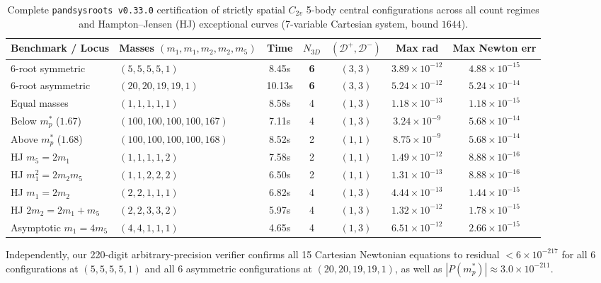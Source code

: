 \documentclass[11pt,a4paper]{amsart}
\theoremstyle{definition}
\theoremstyle{remark}
\begin{document}
\begin{table}[ht]
\centering
\caption{Complete \texttt{pandsysroots v0.33.0} certification of strictly spatial $C_{2v}$
5-body central configurations across all count regimes and Hampton--Jensen (HJ)
exceptional curves (7-variable Cartesian system, bound $1644$).}
\label{tab:pandsysroots}
\footnotesize
\setlength{\tabcolsep}{4pt}
\begin{tabular}{@{}llccccc@{}}
\toprule
Benchmark / Locus & Masses $(m_1,m_1,m_2,m_2,m_5)$ & Time & $N_{3D}$ & $(\mathcal{D}^+, \mathcal{D}^-)$ & Max rad & Max Newton err \\
\midrule
6-root symmetric      & $(5,5,5,5,1)$       & 8.45s & \textbf{6} & $(3,3)$ & $3.89\times 10^{-12}$ & $4.88\times 10^{-15}$ \\
6-root asymmetric     & $(20,20,19,19,1)$   & 10.13s & \textbf{6} & $(3,3)$ & $5.24\times 10^{-12}$ & $5.24\times 10^{-14}$ \\
Equal masses          & $(1,1,1,1,1)$       & 8.58s & 4 & $(1,3)$ & $1.18\times 10^{-13}$ & $1.18\times 10^{-15}$ \\
Below $m_p^*$ ($1.67$)& $(100,100,100,100,167)$ & 7.11s & 4 & $(1,3)$ & $3.24\times 10^{-9}$  & $5.68\times 10^{-14}$ \\
Above $m_p^*$ ($1.68$)& $(100,100,100,100,168)$ & 8.52s & 2 & $(1,1)$ & $8.75\times 10^{-9}$  & $5.68\times 10^{-14}$ \\
HJ $m_5 = 2 m_1$      & $(1,1,1,1,2)$       & 7.58s & 2 & $(1,1)$ & $1.49\times 10^{-12}$ & $8.88\times 10^{-16}$ \\
HJ $m_1^2 = 2m_2 m_5$ & $(1,1,2,2,2)$       & 6.50s & 2 & $(1,1)$ & $1.31\times 10^{-13}$ & $8.88\times 10^{-16}$ \\
HJ $m_1 = 2 m_2$      & $(2,2,1,1,1)$       & 6.82s & 4 & $(1,3)$ & $4.44\times 10^{-13}$ & $1.44\times 10^{-15}$ \\
HJ $2m_2 = 2m_1+m_5$  & $(2,2,3,3,2)$       & 5.97s & 4 & $(1,3)$ & $1.32\times 10^{-12}$ & $1.78\times 10^{-15}$ \\
Asymptotic $m_1=4m_5$ & $(4,4,1,1,1)$       & 4.65s & 4 & $(1,3)$ & $6.51\times 10^{-12}$ & $2.66\times 10^{-15}$ \\
\bottomrule
\end{tabular}
\end{table}

Independently, our 220-digit arbitrary-precision verifier confirms all 15 Cartesian
Newtonian equations to residual $< 6 \times 10^{-217}$ for all 6 configurations at
$(5,5,5,5,1)$ and all 6 asymmetric configurations at $(20,20,19,19,1)$, as well as
$|P(m_p^*)| \approx 3.0 \times 10^{-211}$.
\end{document}
